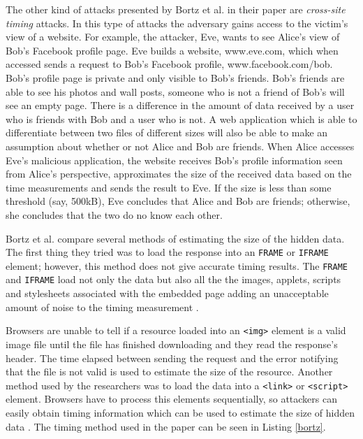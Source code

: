 \documentclass[10pt,a4paper,twoside]{book}
\begin{document}
The other kind of attacks presented by Bortz et al. in their paper are \textit{cross-site timing} attacks. In this type of attacks the adversary gains access to the victim's view of a website. For example, the attacker, Eve, wants to see Alice's view of Bob's Facebook profile page. Eve builds a website, www.eve.com, which when accessed sends a request to Bob's Facebook profile, www.facebook.com/bob. Bob's profile page is private and only visible to Bob's friends. Bob's friends are able to see his photos and wall posts, someone who is not a friend of Bob's will see an empty page. There is a difference in the amount of data received by a user who is friends with Bob and a user who is not. A web application which is able to differentiate between two files of different sizes will also be able to make an assumption about whether or not Alice and Bob are friends. When Alice accesses Eve's malicious application, the website receives Bob's profile information seen from Alice's perspective, approximates the size of the received data based on the time measurements and sends the result to Eve. If the size is less than some threshold (say, 500kB), Eve concludes that Alice and Bob are friends; otherwise, she concludes that the two do no know each other.

Bortz et al. compare several methods of estimating the size of the hidden data. The first thing they tried was to load the response into an \texttt{FRAME} or \texttt{IFRAME} element; however, this method does not give accurate timing results. The \texttt{FRAME} and \texttt{IFRAME} load not only the data but also  all the the images, applets, scripts and stylesheets associated with the embedded page adding an unacceptable amount of noise to the timing measurement \cite{bortz2007exposing}.

Browsers are unable to tell if a resource loaded into an \texttt{<img>} element is a valid image file until the file has finished downloading and they read the response's header. The time elapsed between sending the request and the error notifying that the file is not valid is used to estimate the size of the resource. Another method used by the researchers was to load the data into a \texttt{<link>} or \texttt{<script>} element. Browsers have to process this elements sequentially, so attackers can easily obtain timing information which can be used to estimate the size of hidden data \cite{bortz2007exposing}. The timing method used in the paper can be seen in Listing \ref{bortz}.
\end{document}
